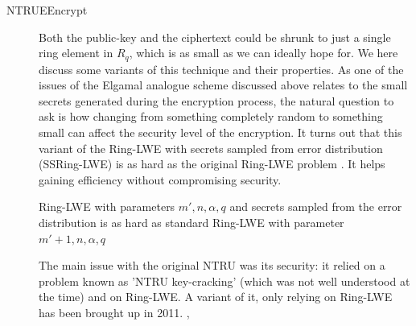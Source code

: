 \begin{description}
\begin{description}
\[    \]
  \end{description}
\item[NTRUEEncrypt \cite{hoffstein1998ntru}] Both the public-key and the
  ciphertext could be shrunk to just a single ring element in $R_q$, which is as
  small as we can ideally hope for. We here discuss some variants of this
  technique and their properties. As one of the issues of the Elgamal analogue
  scheme discussed above relates to the small secrets generated during the
  encryption process, the natural question to ask is how changing from something
  completely random to something small can affect the security level of the
  encryption. It turns out that this variant of the Ring-LWE with secrets
  sampled from error distribution (SSRing-LWE) is as hard as the original
  Ring-LWE problem \cite{lyubashevsky2008lattice}. It helps gaining efficiency
  without compromising security.

  \begin{lemma}
    \label{lem:SSRing-LWE}
    Ring-LWE with parameters \(m', n, \alpha, q\) and secrets sampled from the
    error distribution is as hard as standard Ring-LWE with parameter
    \(m' + 1, n, \alpha, q\)
  \end{lemma}


  The main issue with the original NTRU was its security: it relied on a
  problem known as 'NTRU key-cracking' (which was not well understood at the time) and on
  Ring-LWE. A variant of it, only relying on Ring-LWE has been brought up in 2011.
  \cite{stehle2011making},
\end{description}


